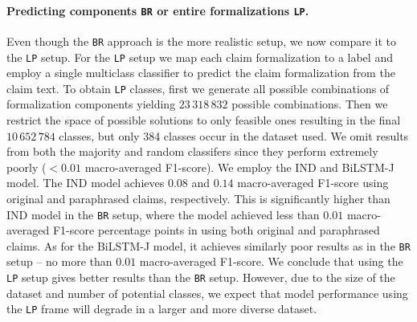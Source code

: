 \paragraph{Predicting components \texttt{BR} or entire formalizations \texttt{LP}.} 
Even though the
\texttt{BR} approach is the more realistic setup, we now compare it
to the \texttt{LP} setup. For the \texttt{LP} setup
we map each claim formalization to a label and employ a single multiclass
classifier to predict the claim formalization from the claim text.
To obtain \texttt{LP} classes, first we generate all possible combinations of 
formalization components yielding $23\,318\,832$ possible combinations.
Then we restrict the space of possible solutions to only feasible ones
resulting in the final $10\,652\,784$ classes, but only 384 classes
occur in the dataset used. 
We omit results from both the majority and random classifers since they
perform extremely poorly ($<0.01$ macro-averaged F1-score).
We employ the IND and BiLSTM-J model. The IND model achieves 
$0.08$ and $0.14$ macro-averaged F1-score using original and
paraphrased claims, respectively. This is significantly higher than 
IND model in the \texttt{BR} setup, where the model achieved less than $0.01$
macro-averaged F1-score percentage points in using both original and paraphrased claims.
As for the BiLSTM-J model, it achieves similarly poor results as in the
\texttt{BR} setup -- no more than $0.01$ macro-averaged F1-score. 
We conclude that using the \texttt{LP} setup gives better results than the 
\texttt{BR} setup. However, due to the size of the dataset and number of potential 
classes, we expect that model performance using the \texttt{LP} frame
will degrade in a larger and more diverse dataset. 

